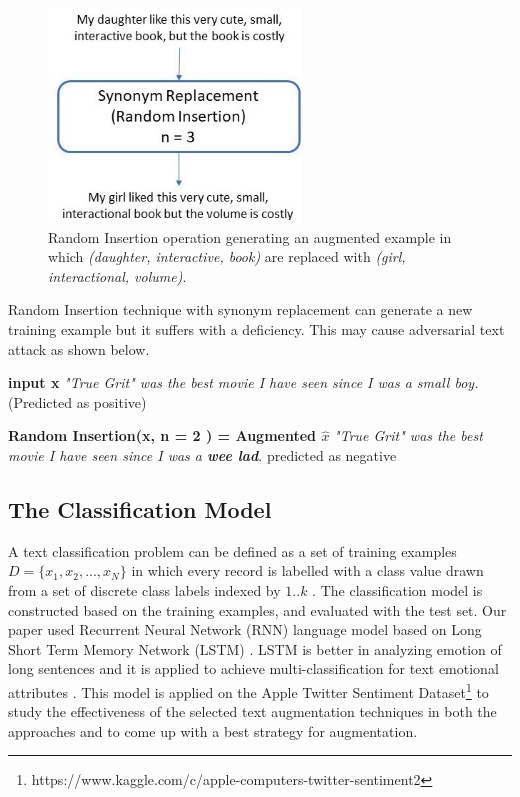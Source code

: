\documentclass{article}
\begin{document}
\begin{figure}[h!]
\centering
  \includegraphics[width=0.6\textwidth]{random insertion.jpg}
  \caption{Random Insertion operation generating an augmented example in which \textit{(daughter, interactive, book)} are replaced with \textit{(girl, interactional, volume)}.}
  \label{fig:randominsert}
\end{figure}

Random Insertion technique with synonym replacement can generate a new training example but it suffers with a deficiency. This may cause adversarial text attack as shown below.

\textbf{input x} \textrightarrow \textit{"True Grit" was the best movie I have seen since I was a small boy.} (Predicted as positive)

\textbf{Random Insertion(x, n = 2 ) = Augmented $\hat{x}$} \textrightarrow \textit{"True Grit" was the best movie I have seen since I was a \textbf{wee lad}}. {predicted as negative}


\subsection{The Classification Model}	

A text classification problem can be defined as a set of training examples $D = \{ x_1, x_2, . . ., x_N\}$ in which every record is labelled with a class value drawn from a set of discrete class labels indexed by ${1..k}$ \cite{aggarwal2012survey}. The classification model is constructed based on the training examples, and evaluated with the test set. Our paper used Recurrent Neural Network (RNN) language model based on Long Short Term Memory Network (LSTM) \cite{can2018multilingual}. LSTM is better in analyzing emotion of long sentences and it is applied to achieve multi-classification for text emotional attributes \cite{li2016text}. This model is applied on  the Apple Twitter Sentiment Dataset\footnote{https://www.kaggle.com/c/apple-computers-twitter-sentiment2} to study the effectiveness of the selected text augmentation techniques in both the approaches and to come up with a best strategy for augmentation.
\end{document}
